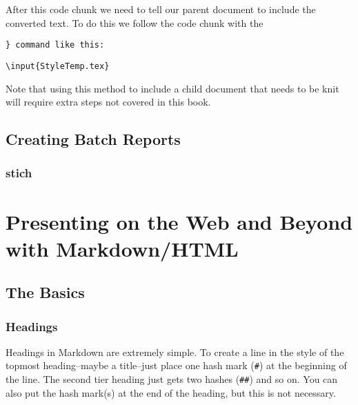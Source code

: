 \documentclass[ChapterTOCs,krantz1]{krantz}\usepackage{graphicx, color}
\makeatletter
\newenvironment{kframe}{%
 \def\at@end@of@kframe{}%
 \ifinner\ifhmode%
  \def\at@end@of@kframe{\end{minipage}}%
  \begin{minipage}{\columnwidth}%
 \fi\fi%
 \def\FrameCommand##1{\hskip\@totalleftmargin \hskip-\fboxsep
 \colorbox{shadecolor}{##1}\hskip-\fboxsep
     \hskip-\linewidth \hskip-\@totalleftmargin \hskip\columnwidth}%
 \MakeFramed {\advance\hsize-\width
   \@totalleftmargin\z@ \linewidth\hsize
   \@setminipage}}%
 {\par\unskip\endMakeFramed%
 \at@end@of@kframe}
\newenvironment{knitrout}{}{} %
\makeatother
\begin{document}
After this code chunk we need to tell our parent document to include the converted text. To do this we follow the code chunk with the {\tt{\}} command like this:

\begin{knitrout}
\color{fgcolor}\begin{kframe}
\begin{alltt}
\textbackslash{}input\{StyleTemp.tex\}
\end{alltt}
\end{kframe}
\end{knitrout}


\noindent Note that using this method to include a child document that needs to be knit will require extra steps not covered in this book.


\section{Creating Batch Reports}

\subsection{stich}




\chapter{Presenting on the Web and Beyond with Markdown/HTML}

\section{The Basics}

\subsection{Headings}

Headings in Markdown are extremely simple. To create a line in the style
of the topmost heading--maybe a title--just place one hash mark
(\texttt{\#}) at the beginning of the line. The second tier heading just
gets two hashes (\texttt{\#\#}) and so on. You can also put the hash
mark(s) at the end of the heading, but this is not necessary.
\end{document}
